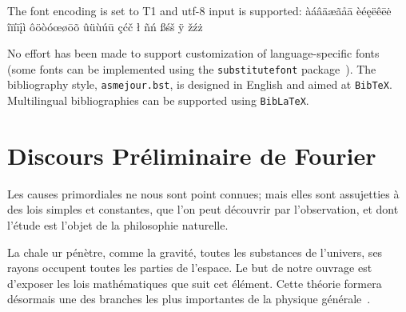 \documentclass[subscriptcorrection,upint,varvw,barcolor=Goldenrod3,mathalfa=cal=euler,balance,hyphenate,french,pdf-a]{asmejour} %
\begin{document}
The font encoding is set to T1 and utf-8 input is supported:
\ifluatex{}\fi
àáâäæãåā  èéęëêēė  îïíīįì ôöòóœøōõ ûüùúū çćč ł ñń ßśš ÿ žźż 

No effort has been made to support customization of language-specific fonts (some fonts can be implemented using the \texttt{substitutefont} package~\cite{milde}). The bibliography style, \texttt{asmejour.bst}, is designed in English and aimed at \texttt{BibTeX}.  Multilingual bibliographies can be supported using \texttt{BibLaTeX}.

\section{Discours Préliminaire de Fourier}\label{app:fourier}

Les causes primordiales ne nous sont point con­nues; mais elles sont assujetties à des lois simples et constantes, que l'on peut découvrir par l'obser­vation, et dont l'étude est l'objet de la philosophie naturelle. 

La chale ur pénètre, comme la gravité, toutes les substances de l'univers, ses rayons occupent toutes les parties de l'espace. Le but de notre ouvrage est d'exposer les lois mathématiques que suit cet élé­ment. Cette théorie formera désormais une des branches les plus importantes de la physique gé­nérale~\cite{fourier1822}. 





\nocite{*} %




\end{document}

